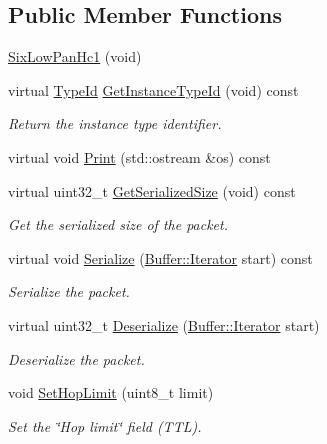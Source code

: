 \subsection*{Public Member Functions}
\begin{DoxyCompactItemize}
\item 
\hyperlink{classns3_1_1SixLowPanHc1_a6f99ea6bd8f144d49bea8f97b236e3d3}{Six\+Low\+Pan\+Hc1} (void)
\item 
virtual \hyperlink{classns3_1_1TypeId}{Type\+Id} \hyperlink{classns3_1_1SixLowPanHc1_ab2144854d3644476a784738ce77f0faf}{Get\+Instance\+Type\+Id} (void) const 
\begin{DoxyCompactList}\small\item\em Return the instance type identifier. \end{DoxyCompactList}\item 
virtual void \hyperlink{classns3_1_1SixLowPanHc1_aa2c173271d1a19008f745a1dbce50e73}{Print} (std\+::ostream \&os) const 
\item 
virtual uint32\+\_\+t \hyperlink{classns3_1_1SixLowPanHc1_afe77409c9adf120e4562da80bf8c0fb1}{Get\+Serialized\+Size} (void) const 
\begin{DoxyCompactList}\small\item\em Get the serialized size of the packet. \end{DoxyCompactList}\item 
virtual void \hyperlink{classns3_1_1SixLowPanHc1_a0cbdc07db09ec3ee81527f29c6a13a9a}{Serialize} (\hyperlink{classns3_1_1Buffer_1_1Iterator}{Buffer\+::\+Iterator} start) const 
\begin{DoxyCompactList}\small\item\em Serialize the packet. \end{DoxyCompactList}\item 
virtual uint32\+\_\+t \hyperlink{classns3_1_1SixLowPanHc1_a284dddfe9b47e16a87f350ef7b1852f9}{Deserialize} (\hyperlink{classns3_1_1Buffer_1_1Iterator}{Buffer\+::\+Iterator} start)
\begin{DoxyCompactList}\small\item\em Deserialize the packet. \end{DoxyCompactList}\item 
void \hyperlink{classns3_1_1SixLowPanHc1_a27e892a7e5771a90ee2aeb2d13fac018}{Set\+Hop\+Limit} (uint8\+\_\+t limit)
\begin{DoxyCompactList}\small\item\em Set the \char`\"{}\+Hop limit\char`\"{} field (T\+TL). \end{DoxyCompactList}\item 

\end{DoxyCompactItemize}
